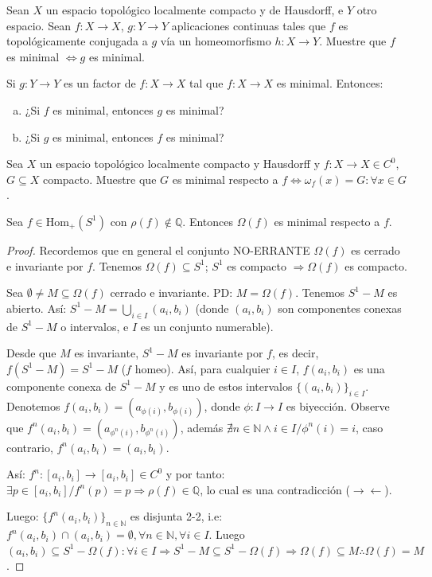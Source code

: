 \begin{ejercicio}
	Sean $X$ un espacio topológico localmente compacto y de Hausdorff, e $Y$ otro espacio. Sean $f: X \to X$, $g: Y \to Y$ aplicaciones continuas tales que $f$ es topológicamente conjugada a $g$ vía un homeomorfismo $h: X \to Y$. Muestre que $f$ es minimal $\iff g$ es minimal.
\end{ejercicio}

\begin{ejercicio}
	Si $g: Y \to Y$ es un factor de $f: X \to X$ tal que $f: X \to X$ es minimal. Entonces:
	\begin{enumerate}[a)]
		\item ¿Si $f$ es minimal, entonces $g$ es minimal?
		\item ¿Si $g$ es minimal, entonces $f$ es minimal?
	\end{enumerate}
\end{ejercicio}

\begin{ejercicio}
	Sea $X$ un espacio topológico localmente compacto y Hausdorff y $f: X \to X \in C^0$, $G \subseteq X$ compacto. Muestre que $G$ es minimal respecto a $f \iff \omega_f(x) = G : \forall x \in G$.
\end{ejercicio}

\begin{teorema}
	Sea $f \in \text{Hom}_+(S^1)$ con $\rho(f) \notin \mathbb{Q}$. Entonces $\Omega(f)$ es minimal respecto a $f$.
\end{teorema}
\begin{proof}
	Recordemos que en general el conjunto NO-ERRANTE $\Omega(f)$ es cerrado e invariante por $f$. Tenemos $\Omega(f) \subseteq S^1$; $S^1$ es compacto $\Rightarrow \Omega(f)$ es compacto.
	
	Sea $\emptyset \neq M \subseteq \Omega(f)$ cerrado e invariante. PD: $M = \Omega(f)$.
	Tenemos $S^1 - M$ es abierto. Así: $S^1 - M = \bigcup_{i \in I} (a_i, b_i)$ (donde $(a_i,b_i)$ son componentes conexas de $S^1 - M$ o intervalos, e $I$ es un conjunto numerable).
	
	Desde que $M$ es invariante, $S^1 - M$ es invariante por $f$, es decir, $f(S^1 - M) = S^1 - M$ ($f$ homeo). Así, para cualquier $i \in I$, $f(a_i, b_i)$ es una componente conexa de $S^1 - M$ y es uno de estos intervalos $\{(a_i, b_i)\}_{i \in I}$. Denotemos $f(a_i, b_i) = (a_{\phi(i)}, b_{\phi(i)})$, donde $\phi: I \to I$ es biyección. Observe que $f^n(a_i, b_i) = (a_{\phi^n(i)}, b_{\phi^n(i)})$, además $\nexists n \in \mathbb{N} \land i \in I / \phi^n(i) = i$, caso contrario, $f^n(a_i, b_i) = (a_i, b_i)$.
	
	Así: $f^n: [a_i, b_i] \to [a_i, b_i] \in C^0$ y por tanto: $\exists p \in [a_i, b_i] / f^n(p) = p \Rightarrow \rho(f) \in \mathbb{Q}$, lo cual es una contradicción ($\rightarrow \leftarrow$).
	
	Luego: $\{f^n(a_i, b_i)\}_{n \in \mathbb{N}}$ es disjunta 2-2, i.e: $f^n(a_i, b_i) \cap (a_i, b_i) = \emptyset, \forall n \in \mathbb{N}, \forall i \in I$. Luego $(a_i, b_i) \subseteq S^1 - \Omega(f) : \forall i \in I \Rightarrow S^1 - M \subseteq S^1 - \Omega(f) \Rightarrow \Omega(f) \subseteq M \therefore \Omega(f) = M$.
\end{proof}


